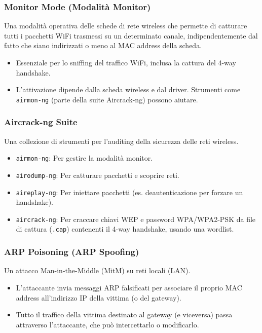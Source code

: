 \subsubsection{Monitor Mode (Modalità Monitor)}
Una modalità operativa delle schede di rete wireless che permette di catturare tutti i pacchetti WiFi trasmessi su un determinato canale, indipendentemente dal fatto che siano indirizzati o meno al MAC address della scheda.
\begin{itemize}
    \item Essenziale per lo sniffing del traffico WiFi, inclusa la cattura del 4-way handshake.
    \item L'attivazione dipende dalla scheda wireless e dal driver. Strumenti come \texttt{airmon-ng} (parte della suite Aircrack-ng) possono aiutare.
\end{itemize}

\subsubsection{Aircrack-ng Suite}
Una collezione di strumenti per l'auditing della sicurezza delle reti wireless.
\begin{itemize}
    \item \texttt{airmon-ng}: Per gestire la modalità monitor.
    \item \texttt{airodump-ng}: Per catturare pacchetti e scoprire reti.
    \item \texttt{aireplay-ng}: Per iniettare pacchetti (es. deautenticazione per forzare un handshake).
    \item \texttt{aircrack-ng}: Per craccare chiavi WEP e password WPA/WPA2-PSK da file di cattura (\texttt{.cap}) contenenti il 4-way handshake, usando una wordlist.
\end{itemize}

\subsubsection{ARP Poisoning (ARP Spoofing)}
Un attacco Man-in-the-Middle (MitM) su reti locali (LAN).
\begin{itemize}
    \item L'attaccante invia messaggi ARP falsificati per associare il proprio MAC address all'indirizzo IP della vittima (o del gateway).
    \item Tutto il traffico della vittima destinato al gateway (e viceversa) passa attraverso l'attaccante, che può intercettarlo o modificarlo.
\end{itemize}

